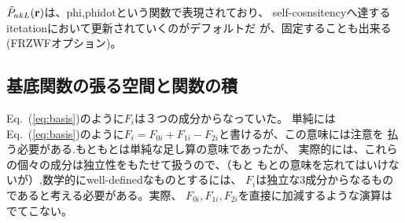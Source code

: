 \documentclass[a4paper,10pt,aip,onecolumn,amsmath,amssymb,floatfix,rmp]{revtex4-1}
\newcommand{\bfr}{{\bf r}}
\newcommand{\req}[1]{\mbox{Eq.~\!(\ref{#1})}}
\begin{document}
$\tilde{P}_{akL}(\bfr)$は、phi,phidotという関数で表現されており、
self-cosnsitencyへ達するitetationにおいて更新されていくのがデフォルトだ
が、固定することも出来る(FRZWFオプション)。



\subsection{基底関数の張る空間と関数の積} 
\req{eq:basis}のように$F_i$は３つの成分からなっていた。
単純には\req{eq:basis}のように$F_i=F_{0i}+F_{1i}-F_{2i}$と書けるが、この意味には注意を
払う必要がある.もともとは単純な足し算の意味であったが、
実際的には、これらの個々の成分は独立性をもたせて扱うので、（もと
もとの意味を忘れてはいけないが）,数学的にwell-definedなものとするには、
$F_i$は独立な3成分からなるものであると考える必要がある。実際、
$F_{0i},F_{1i},F_{2i}$を直接に加減するような演算はでてこない。


%
%
%
\end{document}

